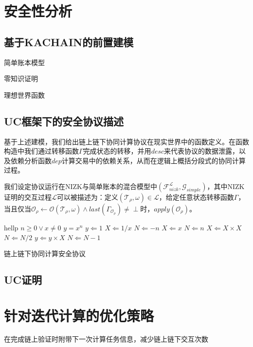 \section{安全性分析}
\subsection{基于KACHAIN的前置建模}
简单账本模型

零知识证明

理想世界函数

\subsection{UC框架下的安全协议描述}
基于上述建模，我们给出链上链下协同计算协议在现实世界中的函数定义。在函数构造中我们通过转移函数$\Gamma$完成状态的转移，并用$desc$来代表协议的数据泄露，以及依赖分析函数$dep$计算交易中的依赖关系，从而在逻辑上概括分段式的协同计算过程。

我们设定协议运行在NIZK与简单账本的混合模型中$(\mathcal{F}_{nizk}^\mathcal{L}, \mathcal{G}_{simple})$，其中NIZK证明的交互过程$\mathcal{L}$可以被描述为：定义$(\mathcal{T}_\rho, \omega) \in \mathcal{L}$，给定任意状态转移函数$\Gamma$，当且仅当$\mathcal{O}_\rho \leftarrow \mathcal{O}(\mathcal{T}_\rho, \omega)\wedge last(\Gamma_{\mathcal{O}_\rho}) \neq \perp$时，$apply(\mathcal{O}_\rho)$。

\begin{algorithm}[H]
    \begin{algorithmic} 
        \STATE hellp
        \REQUIRE $n \geq 0 \vee x \neq 0$
        \ENSURE $y = x^n$
        \STATE $y \Leftarrow 1$
            \STATE $X \Leftarrow 1 / x$
            \STATE $N \Leftarrow -n$
        \ELSE
            \STATE $X \Leftarrow x$
            \STATE $N \Leftarrow n$
        \ENDIF
                \STATE $X \Leftarrow X \times X$
                \STATE $N \Leftarrow N / 2$
            \ELSE[$N$ is odd]
                \STATE $y \Leftarrow y \times X$
                \STATE $N \Leftarrow N - 1$
            \ENDIF
        \ENDWHILE
    \end{algorithmic}
    \caption{\label{alg:function}链上链下协同计算安全协议}
\end{algorithm}

\subsection{UC证明}

\section{针对迭代计算的优化策略}
在完成链上验证时附带下一次计算任务信息，减少链上链下交互次数
